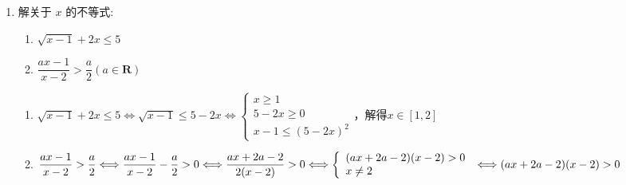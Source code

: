 \begin{enumerate}
    \item 解关于 $x$ 的不等式: 
    \begin{enumerate}
        \item $\sqrt{x - 1} + {2x} \leq  5$ 
        \item $\dfrac{{ax} - 1}{x - 2} > \dfrac{a}{2}\left( {a \in  \mathbf{R}}\right)$
    \end{enumerate}
    \begin{jieda}
        \begin{enumerate}
            \item $\sqrt{x - 1} + {2x} \leq  5 \Longleftrightarrow \sqrt{x-1} \leq 5 - 2x \Longleftrightarrow \left \{ \begin{array}{l}
                 x \geq 1  \\
                 5-2x \geq 0 \\
                 x-1 \leq (5-2x)^2
            \end{array}\right.$，解得$x \in [1, 2]$
            \item $\dfrac{{ax} - 1}{x - 2} > \dfrac{a}{2} \Longleftrightarrow \dfrac{{ax} - 1}{x - 2} - \dfrac{a}{2} > 0 \Longleftrightarrow \dfrac{ax+2a-2}{2(x-2)} > 0 \Longleftrightarrow \left\{\begin{array}{l}
                 (ax+2a-2)(x-2) > 0 \\
                 x \neq 2
            \end{array}\right. \\
            \Longleftrightarrow (ax+2a-2)(x-2) > 0$
\end{enumerate}
\end{jieda}
\end{enumerate}
